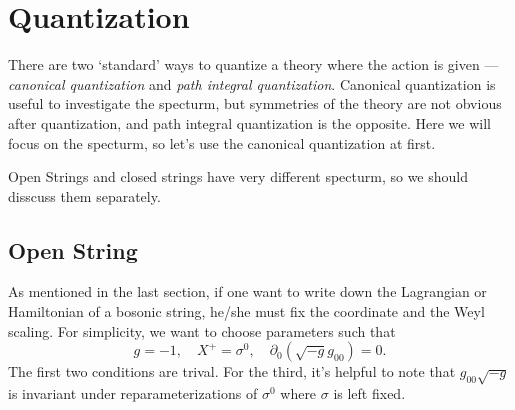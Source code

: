 \section{Quantization}

There are two `standard' ways to quantize a theory where
the action is given --- \textit{canonical quantization}
and \textit{path integral quantization}. 
Canonical quantization is useful to investigate the 
specturm, but symmetries of the theory are not obvious
after quantization, and path integral
quantization is the opposite. Here we will focus on the
specturm, so let's use the canonical quantization at first.

Open Strings and closed strings have very different specturm,
so we should disscuss them separately.

\subsection{Open String}

As mentioned in the last section, if one want to write 
down the Lagrangian or Hamiltonian of a bosonic string,
he/she must fix the coordinate and the Weyl scaling. 
For simplicity, we want to choose parameters such that
\[
	g=-1,\quad X^+=\sigma^0,\quad 
	\partial_0(\sqrt{-g}g_{00})=0.
\]
The first two conditions are trival. For the third,
it's helpful to note that $g_{00}\sqrt{-g}$
is invariant under reparameterizations of $\sigma^0$
where $\sigma$ is left fixed.

